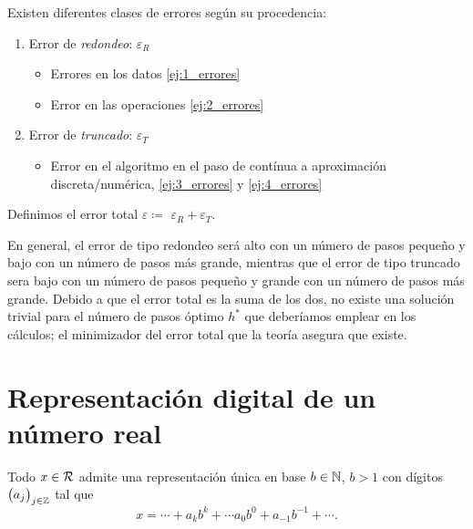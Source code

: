 \begin{defi}[Errores]
    Existen diferentes clases de errores según su procedencia:
    \begin{enumerate}
            \item Error de \emph{redondeo}: $\varepsilon_R$
            \begin{itemize}
                    \item Errores en los datos \ref{ej:1_errores}
                    \item Error en las operaciones \ref{ej:2_errores}
            \end{itemize}
            \item Error de \emph{truncado}: $\varepsilon_T$
            \begin{itemize}
                    \item Error en el algoritmo en el paso de contínua a aproximación discreta/numérica, \ref{ej:3_errores} y \ref{ej:4_errores}
            \end{itemize}
    \end{enumerate}
\end{defi}

\begin{defi}
    Definimos el error total $\varepsilon \coloneqq$ $\varepsilon_R + \varepsilon_T$.
\end{defi}

\begin{obs}
    En general, el error de tipo redondeo será alto con un número de pasos pequeño y bajo con un número de pasos más grande, mientras que el error de tipo truncado sera bajo con un número de pasos pequeño y grande con un número de pasos más grande. Debido a que el error total es la suma de los dos, no existe una solución trivial para el número de pasos óptimo $h^*$ que deberíamos emplear en los cálculos; el minimizador del error total que la teoría asegura que existe.
\end{obs}

\section{Representación digital de un número real}
    
\begin{prop}
    Todo $x \in \mathcal{R}$ admite una representación única en base $b \in \mathbb{N}$, $b>1$ con dígitos $\left(  a_j\right)  _{j \in \mathbb{Z}}$ tal que 
    \[
            x = \cdots + a_kb^k + \cdots a_0b^0 + a_{-1}b^{-1} + \cdots \nonumber.
    \]
\end{prop}

